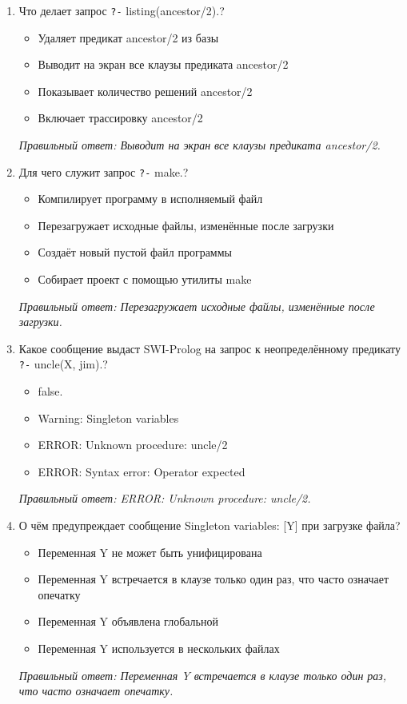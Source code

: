 \begin{enumerate}[label=\textbf{\arabic*.}, leftmargin=0pt, itemsep=1.2em]
\item Что делает запрос \texttt{?-} listing(ancestor/2).?
\begin{itemize}[label=$\square$, leftmargin=1.5cm, itemsep=0.2em, topsep=0.3em]
\item Удаляет предикат ancestor/2 из базы
\item Выводит на экран все клаузы предиката ancestor/2
\item Показывает количество решений ancestor/2
\item Включает трассировку ancestor/2
\end{itemize}
{\small\textit{Правильный ответ: Выводит на экран все клаузы предиката ancestor/2.}}

\item Для чего служит запрос \texttt{?-} make.?
\begin{itemize}[label=$\square$, leftmargin=1.5cm, itemsep=0.2em, topsep=0.3em]
\item Компилирует программу в исполняемый файл
\item Перезагружает исходные файлы, изменённые после загрузки
\item Создаёт новый пустой файл программы
\item Собирает проект с помощью утилиты make
\end{itemize}
{\small\textit{Правильный ответ: Перезагружает исходные файлы, изменённые после загрузки.}}

\item Какое сообщение выдаст SWI-Prolog на запрос к неопределённому предикату \texttt{?-} uncle(X, jim).?
\begin{itemize}[label=$\square$, leftmargin=1.5cm, itemsep=0.2em, topsep=0.3em]
\item false.
\item Warning: Singleton variables
\item ERROR: Unknown procedure: uncle/2
\item ERROR: Syntax error: Operator expected
\end{itemize}
{\small\textit{Правильный ответ: ERROR: Unknown procedure: uncle/2.}}

\item О чём предупреждает сообщение Singleton variables: [Y] при загрузке файла?
\begin{itemize}[label=$\square$, leftmargin=1.5cm, itemsep=0.2em, topsep=0.3em]
\item Переменная Y не может быть унифицирована
\item Переменная Y встречается в клаузе только один раз, что часто означает опечатку
\item Переменная Y объявлена глобальной
\item Переменная Y используется в нескольких файлах
\end{itemize}
{\small\textit{Правильный ответ: Переменная Y встречается в клаузе только один раз, что часто означает опечатку.}}


\end{enumerate}
